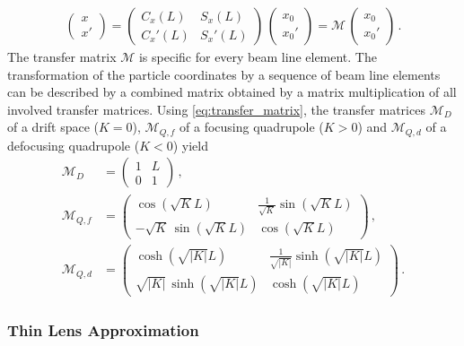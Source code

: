 %
\begin{align}
\begin{pmatrix} x \\ x' \end{pmatrix} = \begin{pmatrix} C_x (L) & S_x(L) \\ C_x'(L) & S_x'(L)  \end{pmatrix} \, \begin{pmatrix} x_0 \\ x_0' \end{pmatrix} = \mathcal{M} \, \begin{pmatrix} x_0 \\ x_0' \end{pmatrix} \, . \label{eq:transfer_matrix}
\end{align}
%
The transfer matrix $\mathcal{M}$ is specific for every beam line element. The transformation of the particle coordinates by a sequence of beam line elements can be described by a combined matrix obtained by a matrix multiplication of all involved transfer matrices. 
Using \eqref{eq:transfer_matrix}, the transfer matrices $\mathcal{M}_D$ of a drift space ($K=0$), $\mathcal{M}_{Q,f}$ of a focusing quadrupole ($K>0$) and $\mathcal{M}_{Q,d}$ of a defocusing quadrupole ($K<0$) yield
\begin{align}
  \mathcal{M}_D &= \begin{pmatrix} 1 & L \\ 0 & 1   \end{pmatrix} \,, \\
\mathcal{M}_{Q,f} &=  \begin{pmatrix} \cos \left(\sqrt{K}L\right) &  \frac{1}{\sqrt{K}}\sin \left(\sqrt{K}L\right) \\ - \sqrt{K} \, \sin \left( \sqrt{K} L \right) & \cos \left(\sqrt{K} L \right)    \end{pmatrix}  \, , \\ 
%
\mathcal{M}_{Q,d} &=  \begin{pmatrix} \cosh \left(\sqrt{|K|}L\right) &  \frac{1}{\sqrt{|K|}}\sinh \left(\sqrt{|K|}L\right) \\  \sqrt{|K|} \, \sinh \left( \sqrt{|K|} L \right) & \cosh \left(\sqrt{|K|} L \right)    \end{pmatrix}  \,.
%
\end{align}



\subsubsection{Thin Lens Approximation}


